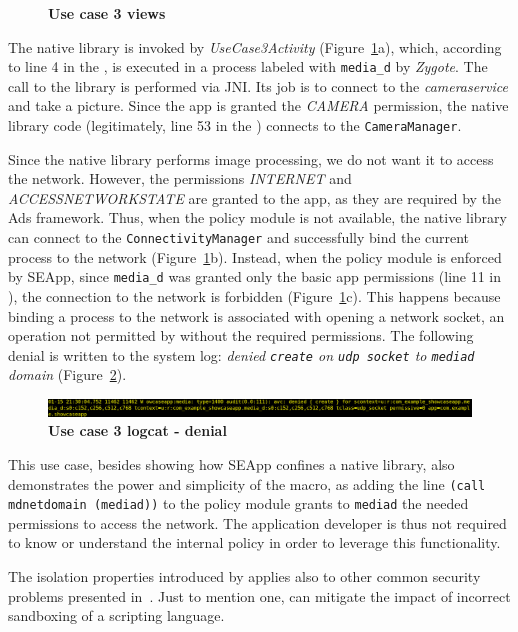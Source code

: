 \begin{figure}[h]
  \caption{\label{fig:seapp_uc3_views}\bf Use case 3 views}
\end{figure}

The native library is invoked by {\em UseCase3Activity}
(Figure~\ref{fig:seapp_uc3_views}a), which, according to line 4 in the
\seappcontexts, is executed in a process labeled with {\tt media\_d}
by {\em Zygote}.  The call to the library is performed via JNI. Its
job is to connect to the {\em camera\textunderscore service} and take
a picture.  Since the app is granted the {\em CAMERA} permission, the
native library code (legitimately, line 53 in the \sepolicy) connects
to the {\tt CameraManager}.

Since the native library performs image processing, we do not want it
to access the network. However, the permissions {\em INTERNET} and
{\em ACCESS\textunderscore NETWORK\textunderscore STATE} are granted
to the app, as they are required by the Ads framework.  Thus, when the
policy module is not available, the native library can connect to the
{\tt ConnectivityManager} and successfully bind the current process to
the network (Figure~\ref{fig:seapp_uc3_views}b).  Instead, when the
policy module is enforced by SEApp, since {\tt media\_d} was granted
only the basic app permissions (line 11 in \sepolicy), the connection
to the network is forbidden (Figure~\ref{fig:seapp_uc3_views}c).  This
happens because binding a process to the network is associated with
opening a network socket, an operation not permitted by \sel without
the required permissions. The following denial is written to the
system log: {\em denied {\tt create} on {\tt udp\textunderscore
    socket} to {\tt media\textunderscore d} domain}
(Figure~\ref{fig:seapp_uc3_logcat}).

\begin{figure}[h]
  \centering
  \includegraphics[width=\textwidth]{chapters/seapp/figs/ae/uc35.png}
  \caption{\label{fig:seapp_uc3_logcat} \bf Use case 3 logcat - \sel denial}  
\end{figure}      

This use case, besides showing how SEApp confines a native library,
also demonstrates the power and simplicity of the macro, as adding the
line {\tt (call md\textunderscore netdomain (media\textunderscore d))}
to the policy module grants to {\tt media\textunderscore d} the needed
permissions to access the network.  The application developer is thus
not required to know or understand the internal \sel policy in order
to leverage this functionality.

The isolation properties introduced by \pap applies also to other
common security problems presented
in~\cite{seapp_common_play_protect_vulnerabilites}. Just to mention
one, \pap can mitigate the impact of incorrect sandboxing of a
scripting language.

